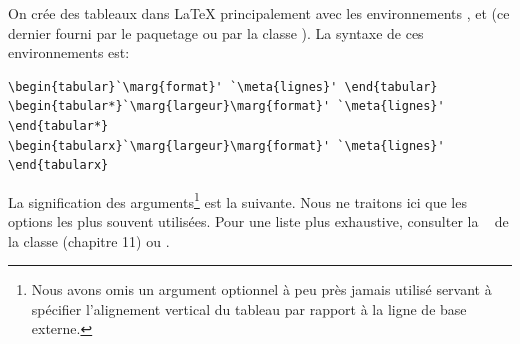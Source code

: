 On crée des tableaux dans {\LaTeX} principalement avec les
environnements ,  et  (ce
dernier fourni par le paquetage  ou par la classe
). La syntaxe de ces environnements est:
\begin{lstlisting}
\begin{tabular}`\marg{format}' `\meta{lignes}' \end{tabular}
\begin{tabular*}`\marg{largeur}\marg{format}' `\meta{lignes}' \end{tabular*}
\begin{tabularx}`\marg{largeur}\marg{format}' `\meta{lignes}' \end{tabularx}
\end{lstlisting}
La signification des arguments\footnote{%
  Nous avons omis un argument optionnel à peu près jamais utilisé
  servant à spécifier l'alignement vertical du tableau par rapport à
  la ligne de base externe.} %
est la suivante. Nous ne traitons ici que les options les plus souvent
utilisées. Pour une liste plus exhaustive, consulter la %
de la classe  (chapitre 11) ou %
\citet[section
]{wikilivres:latex}.

